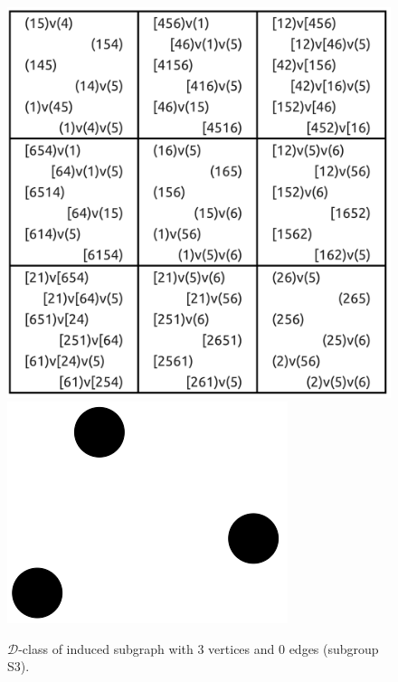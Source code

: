 \begin{appendices}
\begin{figure}[H]
\includegraphics[scale=0.05]{images/x1/x1_3v_0e.png}
\includegraphics[scale=0.2]{images/x1/x1_3v_0e_vis.png}
\caption{$\mathcal{D}$-class of induced subgraph with 3 vertices and 0 edges (subgroup S3).}
\end{figure}


\end{appendices}
